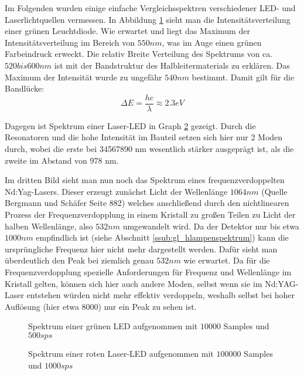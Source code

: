 			Im Folgenden wurden einige einfache Vergleichsspektren verschiedener LED- und Laserlichtquellen vermessen.
			In Abbildung \ref{fig:gr-led-spec} sieht man die Intensitätsverteilung einer grünen Leuchtdiode.
			Wie erwartet und liegt das Maximum der Intensitätsverteilung im Bereich von $550 \unit{nm}$, was im Auge einen grünen Farbeindruck erweckt.
			Die relativ Breite Verteilung des Spektrums von ca. $520 bis 600 \unit{nm}$ ist mit der Bandstruktur des Halbleitermaterials zu erklären.
			Das Maximum der Intensität wurde zu ungefähr $540 \unit{nm}$ bestimmt.
			Damit gilt für die Bandlücke:
			\[ \Delta E = \frac{hc}{\lambda} \approx 2.3 \unit{eV} \]

			Dagegen ist Spektrum einer Laser-LED in Graph \ref{fig:rot-laser-led} gezeigt.
			Durch die Resonatoren und die hohe Intensität im Bauteil setzen sich hier nur 2 Moden durch, wobei die erste bei 34567890 nm wesentlich stärker ausgeprägt ist, als die zweite im Abstand von 978 nm.

			Im dritten Bild sieht man nun noch das Spektrum eines frequenzverdoppelten Nd:Yag-Lasers.
			Dieser erzeugt zunächst Licht der Wellenlänge $1064 \unit{nm}$ (Quelle Bergmann und Schäfer Seite 882) welches anschließend durch den nichtlinearen Prozess der Frequenzverdopplung in einem Kristall zu großen Teilen zu Licht der halben Wellenlänge, also $532 \unit{nm}$ umgewandelt wird.
			Da der Detektor nur bis etwa $1000 \unit{nm}$ empfindlich ist (siehe Abschnitt \ref{ssub:gl_hlampenspektrum}) kann die ursprüngliche Frequenz hier nicht mehr dargestellt werden.
			Dafür sieht man überdeutlich den Peak bei ziemlich genau $532 \unit{nm}$ wie erwartet.
			Da für die Frequenzverdopplung spezielle Anforderungen für Frequenz und Wellenlänge im Kristall gelten, können sich hier auch andere Moden, selbst wenn sie im Nd:YAG-Laser entstehen würden nicht mehr effektiv verdoppeln, weshalb selbst bei hoher Auflösung (hier etwa 8000) nur ein Peak zu sehen ist. 

		
			\begin{figure}[htb]
				\centering
				
				\caption{Spektrum einer grünen LED aufgenommen mit $10000$ Samples und $500 \unit{sps}$}
				\label{fig:gr-led-spec}
			\end{figure}

			\begin{figure}[htb]
				\centering
				
				\caption{Spektrum einer roten Laser-LED aufgenommen mit $100000$ Samples und $1000 \unit{sps}$}
				\label{fig:rot-laser-led}
			\end{figure}


